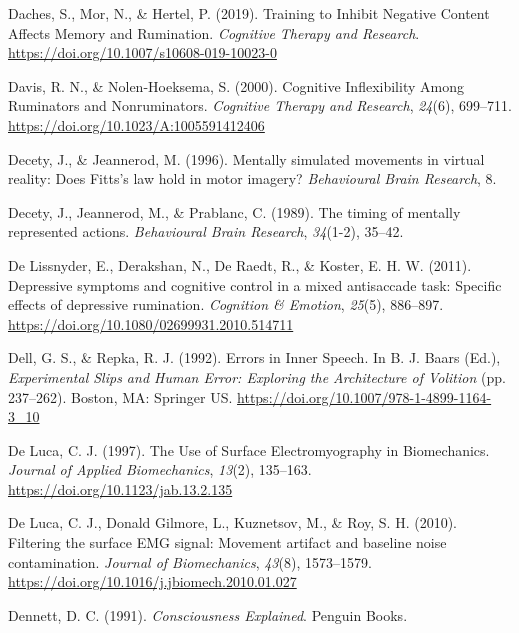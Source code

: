 \documentclass[a4paper,12pt,twoside,openright,oldfontcommands,final]{memoir}
\begin{document}
\leavevmode\hypertarget{ref-daches_training_2019}{}%
Daches, S., Mor, N., \& Hertel, P. (2019). Training to Inhibit Negative Content Affects Memory and Rumination. \emph{Cognitive Therapy and Research}. \url{https://doi.org/10.1007/s10608-019-10023-0}

\leavevmode\hypertarget{ref-Davis2000}{}%
Davis, R. N., \& Nolen-Hoeksema, S. (2000). Cognitive Inflexibility Among Ruminators and Nonruminators. \emph{Cognitive Therapy and Research}, \emph{24}(6), 699--711. \url{https://doi.org/10.1023/A:1005591412406}

\leavevmode\hypertarget{ref-decety_mentally_1996}{}%
Decety, J., \& Jeannerod, M. (1996). Mentally simulated movements in virtual reality: Does Fitts's law hold in motor imagery? \emph{Behavioural Brain Research}, 8.

\leavevmode\hypertarget{ref-decety_timing_1989}{}%
Decety, J., Jeannerod, M., \& Prablanc, C. (1989). The timing of mentally represented actions. \emph{Behavioural Brain Research}, \emph{34}(1-2), 35--42.

\leavevmode\hypertarget{ref-DeLissnyder2011}{}%
De Lissnyder, E., Derakshan, N., De Raedt, R., \& Koster, E. H. W. (2011). Depressive symptoms and cognitive control in a mixed antisaccade task: Specific effects of depressive rumination. \emph{Cognition \& Emotion}, \emph{25}(5), 886--897. \url{https://doi.org/10.1080/02699931.2010.514711}

\leavevmode\hypertarget{ref-dell_errors_1992}{}%
Dell, G. S., \& Repka, R. J. (1992). Errors in Inner Speech. In B. J. Baars (Ed.), \emph{Experimental Slips and Human Error: Exploring the Architecture of Volition} (pp. 237--262). Boston, MA: Springer US. \url{https://doi.org/10.1007/978-1-4899-1164-3_10}

\leavevmode\hypertarget{ref-de_luca_use_1997}{}%
De Luca, C. J. (1997). The Use of Surface Electromyography in Biomechanics. \emph{Journal of Applied Biomechanics}, \emph{13}(2), 135--163. \url{https://doi.org/10.1123/jab.13.2.135}

\leavevmode\hypertarget{ref-de_luca_filtering_2010}{}%
De Luca, C. J., Donald Gilmore, L., Kuznetsov, M., \& Roy, S. H. (2010). Filtering the surface EMG signal: Movement artifact and baseline noise contamination. \emph{Journal of Biomechanics}, \emph{43}(8), 1573--1579. \url{https://doi.org/10.1016/j.jbiomech.2010.01.027}

\leavevmode\hypertarget{ref-dennett_consciousness_1991}{}%
Dennett, D. C. (1991). \emph{Consciousness Explained}. Penguin Books.
\end{document}
